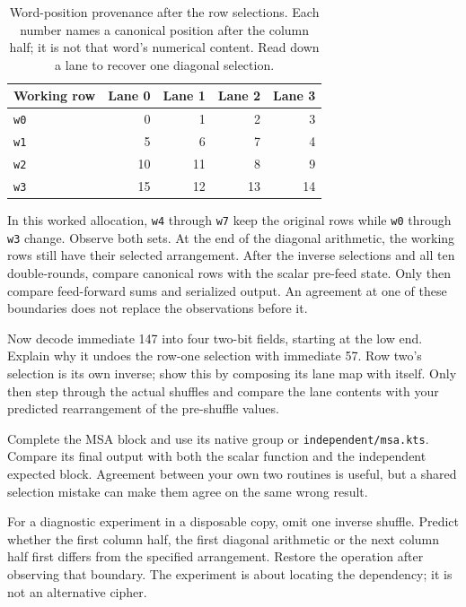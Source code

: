 \begin{table}[htbp]
  \centering
  \begin{tabular}{l r r r r}
    \toprule
    Working row & Lane 0 & Lane 1 & Lane 2 & Lane 3 \\
    \midrule
    \texttt{w0} & 0      & 1      & 2      & 3      \\
    \texttt{w1} & 5      & 6      & 7      & 4      \\
    \texttt{w2} & 10     & 11     & 8      & 9      \\
    \texttt{w3} & 15     & 12     & 13     & 14     \\
    \bottomrule
  \end{tabular}
  \caption{Word-position provenance after the row selections. Each number names
    a canonical position after the column half; it is not that word's numerical
    content. Read down a lane to recover one diagonal selection.}
  \label{revision:chacha-lane-provenance}
\end{table}

In this worked allocation, \texttt{w4} through \texttt{w7} keep the original
rows while \texttt{w0} through \texttt{w3} change. Observe both sets. At the
end of the diagonal arithmetic, the working rows still have their selected
arrangement. After the inverse selections and all ten double-rounds, compare
canonical rows with the scalar pre-feed state. Only then compare feed-forward
sums and serialized output. An agreement at one of these boundaries does not
replace the observations before it.

Now decode immediate 147 into four two-bit fields, starting at the low end.
Explain why it undoes the row-one selection with immediate 57. Row two's
selection is its own inverse; show this by composing its lane map with itself.
Only then step through the actual shuffles and compare the lane contents with
your predicted rearrangement of the pre-shuffle values.

Complete the MSA block and use its native group or
\texttt{independent/msa.kts}. Compare its final output
with both the scalar function and the independent expected block. Agreement
between your own two routines is useful, but a shared selection mistake can make
them agree on the same wrong result.

For a diagnostic experiment in a disposable copy, omit one inverse shuffle.
Predict whether the first column half, the first diagonal arithmetic or the next
column half first differs from the specified arrangement. Restore the operation
after observing that boundary. The experiment is about locating the dependency;
it is not an alternative cipher.


